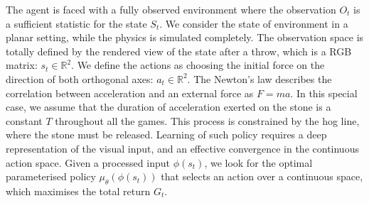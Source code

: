 \documentclass[oneside,11pt,a4paper]{article}
\begin{document}
\newline
\newline
\noindent
The agent is faced with a fully observed environment where the observation $O_t$ is a sufficient statistic for the state $S_t$. We consider the state of environment in a planar setting, while the physics is simulated completely. The observation space is totally defined by the rendered view of the state after a throw, which is a RGB matrix: $s_t \in \mathbb R^2$. We define the actions as choosing the initial force on the direction of both orthogonal axes: $a_t\in \mathbb R^2$. The Newton's law describes the correlation between acceleration and an external force as $F=ma$. In this special case, we assume that the duration of acceleration exerted on the stone is a constant $T$ throughout all the games. This process is constrained by the hog line, where the stone must be released.
\newline
\newline
\noindent
Learning of such policy requires a deep representation of the visual input, and an effective convergence in the continuous action space. Given a processed input $\phi(s_t)$, we look for the optimal parameterised policy $\mu_\theta(\phi(s_t))$ that selects an action over a continuous space, which maximises the total return $G_t$.
\newline
\newline
\noindent
\end{document}

